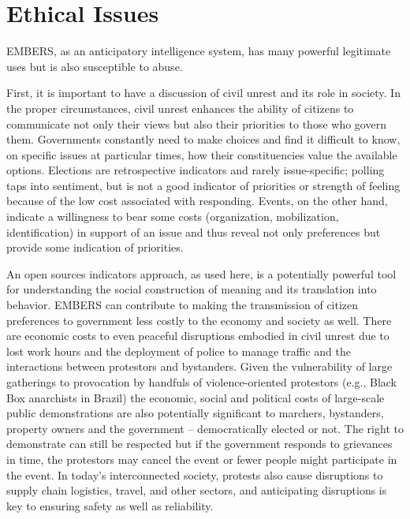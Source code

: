 \section{Ethical Issues}
\label{sec:ethics}
EMBERS, as an anticipatory intelligence system, has many powerful legitimate uses but is also
susceptible to abuse.

First, it is important to have a discussion of civil unrest and its role in society.
In the proper circumstances,
civil unrest enhances the ability of citizens to communicate not only their views but also
their priorities to those who govern them. Governments constantly need to make choices and find
it difficult to know, on specific issues at particular times, how their constituencies value the available
options. Elections are retrospective indicators and rarely issue-specific; polling taps into sentiment,
but is not a good indicator of priorities or strength of feeling because of the
low cost associated with responding. Events, on the other hand, indicate a willingness to
bear some costs (organization, mobilization, identification) in support of an issue and
thus reveal not only preferences but provide some indication of priorities.

An open sources indicators approach, as used here, is a potentially powerful
tool for understanding the social construction of meaning and its translation into behavior.
EMBERS can contribute to making the transmission of citizen preferences to
government less costly to the economy and society as well. There are economic
costs to even peaceful disruptions embodied in civil unrest due to lost work
hours and the deployment of police to manage traffic and the interactions
between protestors and bystanders. Given the vulnerability of large gatherings
to provocation by handfuls of violence-oriented protestors (e.g., Black Box
anarchists in Brazil) the economic, social and political costs of
large-scale public demonstrations are also potentially significant to marchers, bystanders, property owners
and the government -- democratically elected or not. The right to demonstrate can still
be respected but if the government responds to grievances in time,
the protestors may cancel the event or fewer people might participate in the event.
In today's interconnected society, protests also cause disruptions to supply chain logistics, travel, and
other sectors, and anticipating disruptions is key to ensuring safety as well as reliability.

